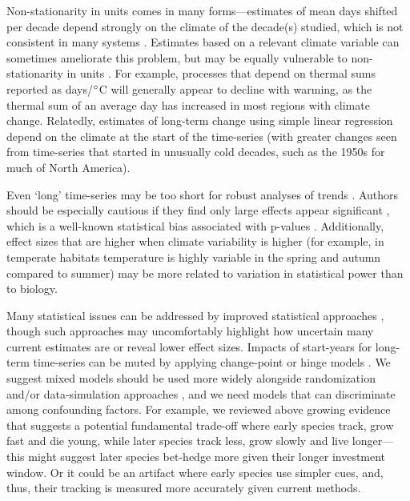 \documentclass[11pt,letterpaper]{article}
\begin{document}
Non-stationarity in units comes in many forms---estimates of mean days shifted per decade depend strongly on the climate of the decade(s) studied, which is not consistent in many systems \citep{McCabe2012}. Estimates based on a relevant climate variable can sometimes ameliorate this problem, but may be equally vulnerable to non-stationarity in units \citep[e.g.,][]{Sagarin:2001fu}. For example, processes that depend on thermal sums reported as days/$\degree$C will generally appear to decline with warming, as the thermal sum of an average day has increased in most regions with climate change. Relatedly, estimates of long-term change using simple linear regression depend on the climate at the start of the time-series (with greater changes seen from time-series that started in unusually cold decades, such as the 1950s for much of North America). 

Even `long' time-series may be too short for robust analyses of trends \citep{bolmgren2013}. Authors should be especially cautious if they find only large effects appear significant \citep[e.g.,][]{CaraDonna2014}, which is a well-known statistical bias associated with p-values \citep{loken2017}. Additionally, effect sizes that are higher when climate variability is higher (for example, in temperate habitats temperature is highly variable in the spring and autumn compared to summer) may be more related to variation in statistical power than to biology. 

Many statistical issues can be addressed by improved statistical approaches \citep[e.g.,][]{gienapp2005,pearse2017}, though such approaches may uncomfortably highlight how uncertain many current estimates are \citep{brown2016} or reveal lower effect sizes. Impacts of start-years for long-term time-series can be muted by applying change-point or hinge models \citep[e.g.,][]{kharouba2018}.  We suggest mixed models should be used more widely alongside randomization and/or data-simulation approaches \citep[e.g.,][]{bolmgren2013}, and we need models that can discriminate among confounding factors. For example, we reviewed above growing evidence that suggests a potential fundamental trade-off where early species track, grow fast and die young, while later species track less, grow slowly and live longer---this might suggest later species bet-hedge more given their longer investment window. Or it could be an artifact where early species use simpler cues, and, thus, their tracking is measured more accurately given current methods. 
\end{document}
